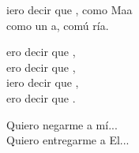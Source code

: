 \begin{cancion}%
	iero decir que , como Maa  \\
	como  un a, comú ría. \jump\\
	\begin{chorus}%
		ero decir que ,  \\
		ero decir que , \\
		iero decir que , \\
		ero decir que . \jump\\
	\end{chorus}%
Quiero negarme a mí...\\
	Quiero entregarme a El...\\
\end{cancion}%
